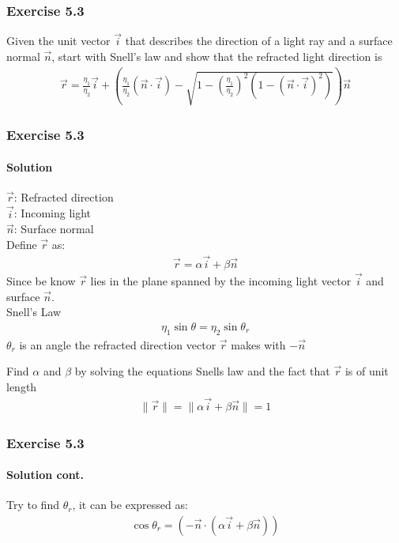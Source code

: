\documentclass[11pt]{beamer}
\begin{document}
	\begin{frame}
			\frametitle{Exercise 5.3}
		Given the unit vector $\vec{i}$ that describes the direction of a light ray and a surface normal $\vec{n}$,
start with Snell’s law and show that the refracted light direction is
	\begin{align}
	\vec{r} = \frac{\eta_1}{\eta_2}\vec{i}+\left(\frac{\eta_1}{\eta_2}(\vec{n}\cdot\vec{i})-\sqrt{1-\left(\frac{\eta_1}{\eta_2}\right)^2 (1-(\vec{n}\cdot\vec{i})^2)}\right)\vec{n}
	\end{align}

	\end{frame}

	\begin{frame}
		\frametitle{Exercise 5.3}
		\framesubtitle{Solution}
		$\vec{r}$: Refracted direction \\
		$\vec{i}$: Incoming light \\
		$\vec{n}$: Surface normal \\
				
		Define $\vec{r}$ as:
		\begin{align}
		\vec{r} = \alpha \vec{i} + \beta \vec{n}
		\end{align}
		Since be know $\vec{r}$ lies in the plane spanned by the incoming light vector $\vec{i}$ and surface $\vec{n}$. \\
		Snell's Law
		\begin{align}
		\eta_1 \sin \theta = \eta_2 \sin \theta_{r}
		\end{align}
		$\theta_{r}$ is an angle the refracted direction vector $\vec{r}$ makes with $-\vec{n}$	\\
		\begin{center}
			Find $\alpha$ and $\beta$ by solving the equations Snells law and the fact that $\vec{r}$ is of unit length
			\begin{align}
				\|\vec{r}\| = \|\alpha \vec{i} + \beta \vec{n}\| = 1
			\end{align}
		\end{center}			
		
	\end{frame}	

	\begin{frame}
		\frametitle{Exercise 5.3}
		\framesubtitle{Solution cont.}
		Try to find $\theta_r$, it can be expressed as:
		\begin{align}
		 \cos \theta_r =(-\vec{n} \cdot (\alpha \vec{i} + \beta \vec{n}))
		\end{align}
	\end{frame}
\end{document}
